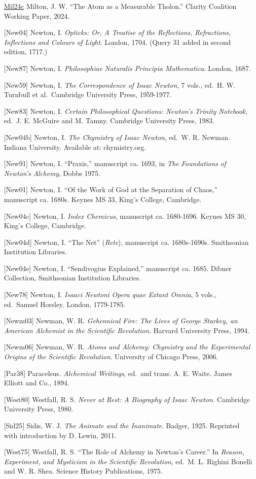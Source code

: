 \documentclass[
  11pt,
  letterpaper,
]{article}
\begin{document}
\href{https://github.com/baardev/truevalue/blob/main/docnav/Research/papers/8_atom-as-tholon-measurable-phenomena/8_atom-as-tholon-measurable-phenomena.pdf}{Mil24c}
Milton, J. W. ``The Atom as a Measurable Tholon.'' Clarity Coalition
Working Paper, 2024.

{[}New04{]} Newton, I. \emph{Opticks: Or, A Treatise of the Reflections,
Refractions, Inflections and Colours of Light}. London, 1704. (Query 31
added in second edition, 1717.)

{[}New87{]} Newton, I. \emph{Philosophiae Naturalis Principia
Mathematica}. London, 1687.

{[}New59{]} Newton, I. \emph{The Correspondence of Isaac Newton}, 7
vols., ed.~H. W. Turnbull et al.~Cambridge University Press, 1959-1977.

{[}New83{]} Newton, I. \emph{Certain Philosophical Questions: Newton's
Trinity Notebook}, ed.~J. E. McGuire and M. Tamny. Cambridge University
Press, 1983.

{[}New04b{]} Newton, I. \emph{The Chymistry of Isaac Newton}, ed.~W. R.
Newman. Indiana University. Available at: chymistry.org.

{[}New91{]} Newton, I. ``Praxis,'' manuscript ca. 1693, in \emph{The
Foundations of Newton's Alchemy}, Dobbs 1975.

{[}New01{]} Newton, I. ``Of the Work of God at the Separation of
Chaos,'' manuscript ca. 1680s. Keynes MS 33, King's College, Cambridge.

{[}New04c{]} Newton, I. \emph{Index Chemicus}, manuscript ca. 1680-1696.
Keynes MS 30, King's College, Cambridge.

{[}New04d{]} Newton, I. ``The Net'' (\emph{Rete}), manuscript ca.
1680s-1690s. Smithsonian Institution Libraries.

{[}New04e{]} Newton, I. ``Sendivogius Explained,'' manuscript ca. 1685.
Dibner Collection, Smithsonian Institution Libraries.

{[}New78{]} Newton, I. \emph{Isaaci Newtoni Opera quae Extant Omnia}, 5
vols., ed.~Samuel Horsley. London, 1779-1785.

{[}Newm03{]} Newman, W. R. \emph{Gehennical Fire: The Lives of George
Starkey, an American Alchemist in the Scientific Revolution}. Harvard
University Press, 1994.

{[}Newm06{]} Newman, W. R. \emph{Atoms and Alchemy: Chymistry and the
Experimental Origins of the Scientific Revolution}. University of
Chicago Press, 2006.

{[}Par38{]} Paracelsus. \emph{Alchemical Writings}, ed.~and trans. A. E.
Waite. James Elliott and Co., 1894.

{[}West80{]} Westfall, R. S. \emph{Never at Rest: A Biography of Isaac
Newton}. Cambridge University Press, 1980.

{[}Sid25{]} Sidis, W. J. \emph{The Animate and the Inanimate}. Badger,
1925. Reprinted with introduction by D. Lewin, 2011.

{[}West75{]} Westfall, R. S. ``The Role of Alchemy in Newton's Career.''
In \emph{Reason, Experiment, and Mysticism in the Scientific
Revolution}, ed.~M. L. Righini Bonelli and W. R. Shea. Science History
Publications, 1975.
\end{document}
